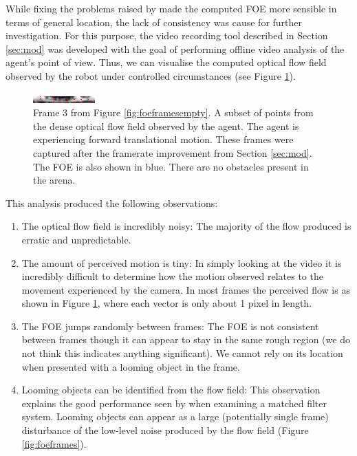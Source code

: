 \documentclass[a4paper,11pt,twoside,openright]{article}
\begin{document}
While fixing the problems raised by \cite{Mitchell2018} made the computed FOE
more sensible in terms of general location, the lack of consistency was cause
for further investigation. For this purpose, the video recording tool described
in Section \ref{sec:mod} was developed with the goal of performing offline
video analysis of the agent's point of view. Thus, we can visualise the
computed optical flow field observed by the robot under controlled circumstances
(see Figure \ref{fig:flowfield}).\newline\par

\begin{figure}[h!]
  \centering
  \includegraphics[width=\textwidth]{frame_00066}
  \caption{\label{fig:flowfield} Frame 3 from Figure
    \ref{fig:foeframesempty}. A subset of points from the dense
    optical flow field observed by the agent.  The agent is
    experiencing forward translational motion. These frames were
    captured after the framerate improvement from Section
    \ref{sec:mod}. The FOE is also shown in blue. There are no
    obstacles present in the arena.  }
\end{figure}

This analysis produced the following observations:
\begin{enumerate}
\item{
  The optical flow field is incredibly noisy: The majority of the flow produced
  is erratic and unpredictable.
}

\item{
  The amount of perceived motion is tiny: In simply looking at the video it is
  incredibly difficult to determine how the motion observed relates to the
  movement experienced by the camera. In most frames the perceived
  flow is as shown in Figure \ref{fig:flowfield}, where each vector is
  only about 1 pixel in length.
}

\item{ The FOE jumps randomly between frames: The FOE is not
  consistent between frames though it can appear to stay in the same
  rough region (we do not think this indicates anything
  significant). We cannot rely on its location when presented with a
  looming object in the frame.  }

\item{ Looming objects can be identified from the flow field: This
  observation explains the good performance seen by
  \cite{Mitchell2018} when examining a matched filter system. Looming
  objects can appear as a large (potentially single frame) disturbance
  of the low-level noise produced by the flow field (Figure
  \ref{fig:foeframes}).  }
\end{enumerate}
\end{document}
